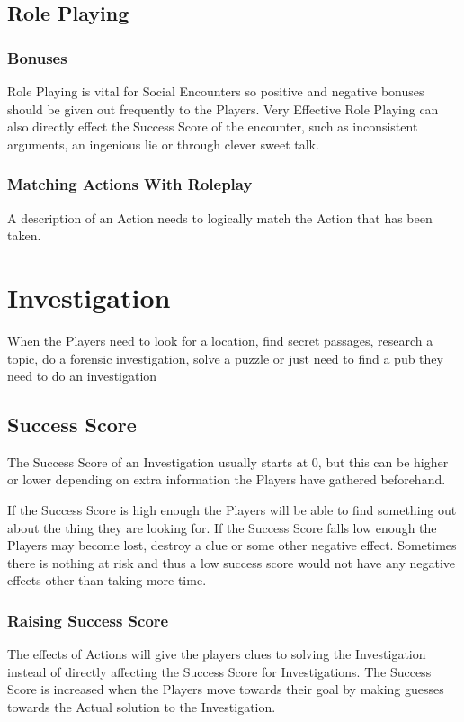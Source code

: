 \documentclass[a4paper,12pt,oneside]{book}
\begin{document}
            \subsection{Role Playing}
                \subsubsection{Bonuses}
                Role Playing is vital for Social Encounters so positive and negative bonuses should be given out frequently to the Players. Very Effective Role Playing can also directly effect the Success Score of the encounter, such as inconsistent arguments, an ingenious lie or through clever sweet talk.

                \subsubsection{Matching Actions With Roleplay}
                    A description of an Action needs to logically match the Action that has been taken.

        \section{Investigation}
            When the Players need to look for a location, find secret passages, research a topic, do a forensic investigation, solve a puzzle or just need to find a pub they need to do an investigation

            \subsection{Success Score}
                The Success Score of an Investigation usually starts at 0, but this can be higher or lower depending on extra information the Players have gathered beforehand.

                If the Success Score is high enough the Players will be able to find something out about the thing they are looking for. If the Success Score falls low enough the Players may become lost, destroy a clue or some other negative effect. Sometimes there is nothing at risk and thus a low success score would not have any negative effects other than taking more time.

                \subsubsection{Raising Success Score}
                    The effects of Actions will give the players clues to solving the Investigation instead of directly affecting the Success Score for Investigations. The Success Score is increased when the Players move towards their goal by making guesses towards the Actual solution to the Investigation.
\end{document}
